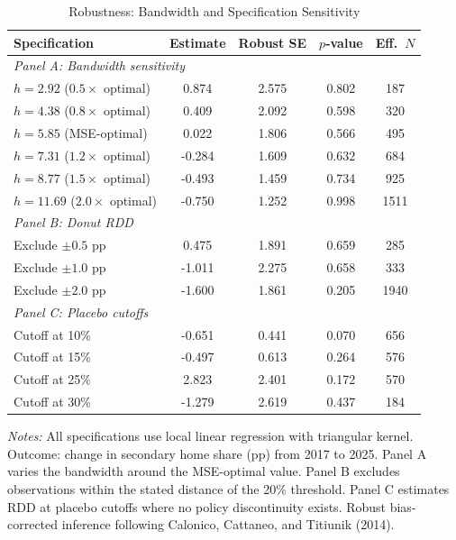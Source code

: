 \begin{table}[htbp]
\centering
\begin{threeparttable}
\caption{Robustness: Bandwidth and Specification Sensitivity}
\label{tab:robustness}
\begin{tabular}{lcccc}
\toprule
Specification & Estimate & Robust SE & $p$-value & Eff.\ $N$ \\
\midrule
\multicolumn{5}{l}{\textit{Panel A: Bandwidth sensitivity}} \\
$h = 2.92$ ($0.5 \times$ optimal) & 0.874 & 2.575 & 0.802 & 187 \\
$h = 4.38$ ($0.8 \times$ optimal) & 0.409 & 2.092 & 0.598 & 320 \\
$h = 5.85$ (MSE-optimal) & 0.022 & 1.806 & 0.566 & 495 \\
$h = 7.31$ ($1.2 \times$ optimal) & -0.284 & 1.609 & 0.632 & 684 \\
$h = 8.77$ ($1.5 \times$ optimal) & -0.493 & 1.459 & 0.734 & 925 \\
$h = 11.69$ ($2.0 \times$ optimal) & -0.750 & 1.252 & 0.998 & 1511 \\
\midrule
\multicolumn{5}{l}{\textit{Panel B: Donut RDD}} \\
Exclude $\pm 0.5$ pp & 0.475 & 1.891 & 0.659 & 285 \\
Exclude $\pm 1.0$ pp & -1.011 & 2.275 & 0.658 & 333 \\
Exclude $\pm 2.0$ pp & -1.600 & 1.861 & 0.205 & 1940 \\
\midrule
\multicolumn{5}{l}{\textit{Panel C: Placebo cutoffs}} \\
Cutoff at 10\% & -0.651 & 0.441 & 0.070 & 656 \\
Cutoff at 15\% & -0.497 & 0.613 & 0.264 & 576 \\
Cutoff at 25\% & 2.823 & 2.401 & 0.172 & 570 \\
Cutoff at 30\% & -1.279 & 2.619 & 0.437 & 184 \\
\bottomrule
\end{tabular}
\begin{tablenotes}[flushleft]
\small
\item \textit{Notes:} All specifications use local linear regression with triangular kernel. Outcome: change in secondary home share (pp) from 2017 to 2025. Panel A varies the bandwidth around the MSE-optimal value. Panel B excludes observations within the stated distance of the 20\% threshold. Panel C estimates RDD at placebo cutoffs where no policy discontinuity exists. Robust bias-corrected inference following Calonico, Cattaneo, and Titiunik (2014).
\end{tablenotes}
\end{threeparttable}
\end{table}

